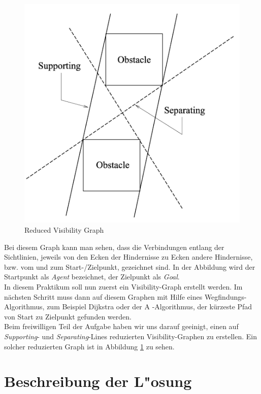\documentclass[a4paper]{scrartcl}
\begin{document}
\begin{figure}[h!]
\includegraphics[width=\textwidth]{Reduced.PNG}
\caption{Reduced Visibility Graph}
\label{img:RedGraph}
\end{figure}
Bei diesem Graph kann man sehen, dass die Verbindungen entlang der Sichtlinien, jeweils von den Ecken der Hindernisse zu Ecken andere Hindernisse, bzw. vom und zum Start-/Zielpunkt, gezeichnet sind. In der Abbildung wird der Startpunkt als \textit{Agent} bezeichnet, der Zielpunkt als \textit{Goal}.\\

In diesem Praktikum soll nun zuerst ein Visibility-Graph erstellt werden. Im nächsten Schritt muss dann auf diesem Graphen mit Hilfe eines Wegfindungs-Algorithmus, zum Beispiel Dijkstra oder der A\* -Algorithmus, der kürzeste Pfad von Start zu Zielpunkt gefunden werden.\\

Beim freiwilligen Teil der Aufgabe haben wir uns darauf geeinigt, einen auf \textit{Supporting}- und \textit{Separating}-Lines reduzierten Visibility-Graphen zu erstellen. Ein solcher reduzierten Graph ist in Abbildung \ref{img:RedGraph} zu sehen.

\section*{Beschreibung der L"osung}
\end{document}
